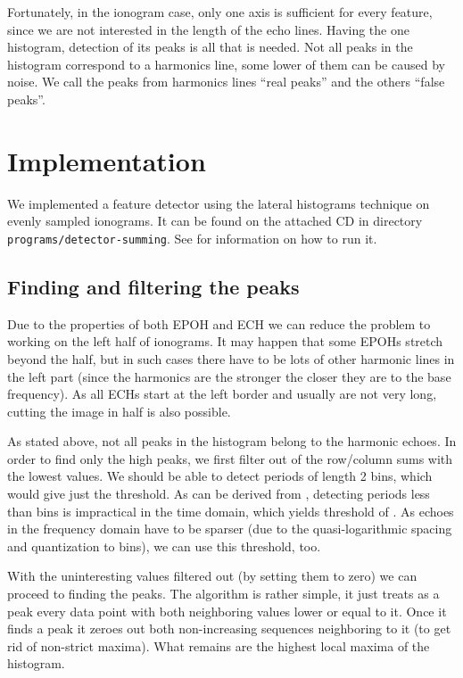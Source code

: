 Fortunately, in the ionogram case, only one axis is sufficient for every feature, since we are not interested in the length of the echo lines. Having the one histogram, detection of its peaks is all that is needed. Not all peaks in the histogram correspond to a harmonics line, some lower of them can be caused by noise. We call the peaks from harmonics lines ``real peaks'' and the others ``false peaks''.

\section{Implementation}
We implemented a feature detector using the lateral histograms technique on evenly sampled ionograms. It can be found on the attached CD in directory \texttt{programs/detector-summing}. See  for information on how to run it. 

\subsection{Finding and filtering the peaks}
Due to the properties of both EPOH and ECH we can reduce the problem to working on the left half of ionograms. It may happen that some EPOHs stretch beyond the half, but in such cases there have to be lots of other harmonic lines in the left part (since the harmonics are the stronger the closer they are to the base frequency). As all ECHs start at the left border and usually are not very long, cutting the image in half is also possible.

As stated above, not all peaks in the histogram belong to the harmonic echoes. In order to find only the high peaks, we first filter out  of the row/column sums with the lowest values. We should be able to detect periods of length 2 bins, which would give just the  threshold. As can be derived from \citep[p.~3]{Akalin2010}, detecting periods less than  bins is impractical in the time domain, which yields threshold of . As echoes in the frequency domain have to be sparser (due to the quasi-logarithmic spacing and quantization to bins), we can use this threshold, too.

With the uninteresting values filtered out (by setting them to zero) we can proceed to finding the peaks. The algorithm is rather simple, it just treats as a peak every data point with both neighboring values lower or equal to it. Once it finds a peak it zeroes out both non-increasing sequences neighboring to it (to get rid of non-strict maxima). What remains are the highest local maxima of the histogram.

